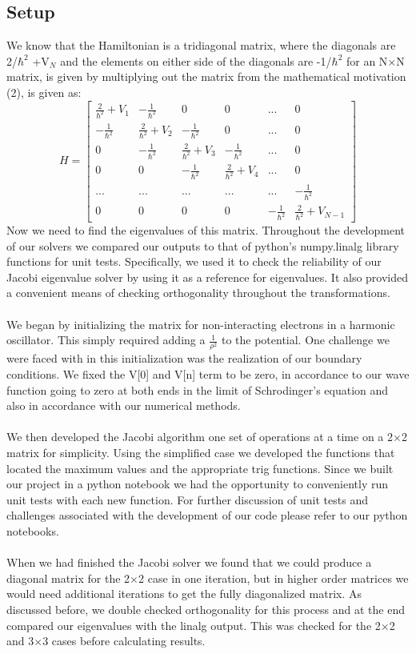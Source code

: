 \documentclass{article}
\begin{document}
\subsection{Setup}
We know that the Hamiltonian is a tridiagonal matrix, where the diagonals are 2/$\hbar^2$ +V$_N$ and the elements on either side of the diagonals are -1/$\hbar^2$ for an N$\times$N matrix, is given by multiplying out the matrix from the mathematical motivation (2), is given as:
\[
H=\begin{bmatrix}
\frac{2}{\hbar^2}+V_1 & -\frac{1}{\hbar^2}&0&0&...&0\\
 -\frac{1}{\hbar^2}&\frac{2}{\hbar^2}+V_2& -\frac{1}{\hbar^2}&0&...&0\\
0& -\frac{1}{\hbar^2}&\frac{2}{\hbar^2}+V_3& -\frac{1}{\hbar^2}&...&0\\
0&0&-\frac{1}{\hbar^2}&\frac{2}{\hbar^2}+V_4&...&0\\
...&...&...&...&...&-\frac{1}{\hbar^2}\\
0&0&0&0& -\frac{1}{\hbar^2}&\frac{2}{\hbar^2}+V_{N-1}
\end{bmatrix}
\]
Now we need to find the eigenvalues of this matrix. Throughout the development of our solvers we compared our outputs to that of python's numpy.linalg library functions for unit tests. Specifically, we used it to check the reliability of our Jacobi eigenvalue solver by using it as a reference for eigenvalues. It also provided a convenient means of checking orthogonality throughout the transformations.\\
\\
We began by initializing the matrix for non-interacting electrons in a harmonic oscillator. This simply required adding a  $\frac{1}{\rho^{2}}$ to the potential. One challenge we were faced with in this initialization was the realization of our boundary conditions. We fixed the V[0] and V[n] term to be zero, in accordance to our wave function going to zero at both ends in the limit of Schrodinger's equation and also in accordance with our numerical methods.\\
\\
We then developed the Jacobi algorithm one set of operations at a time on a 2$\times$2 matrix for simplicity. Using the simplified case we developed the functions that located the maximum values and the appropriate trig functions. Since we built our project in a python notebook we had the opportunity to conveniently run unit tests with each new function. For further discussion of unit tests and challenges associated with the development of our code please refer to our python notebooks. \\
\\
When we had finished the Jacobi solver we found that we could produce a diagonal matrix for the 2$\times$2 case in one iteration, but in higher order matrices we would need additional iterations to get the fully diagonalized matrix. As discussed before, we double checked orthogonality for this process and at the end compared our eigenvalues with the linalg output. This was checked for the 2$\times$2 and 3$\times$3 cases before calculating results.\\
\end{document}
